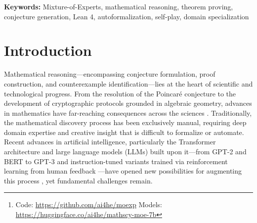 \documentclass[11pt,a4paper]{article}
\begin{document}
\begin{abstract}
evaluation focuses on conjecture generation quality; problem-solving benchmarks (MATH, GSM8K) are planned as future work requiring GPU inference. The trained models, code, and LLM-verified conjectures are publicly available.\footnote{Code: \url{https://github.com/ai4he/moexp} \quad Models: \url{https://huggingface.co/ai4he/mathscy-moe-7b}}
\end{abstract}

\textbf{Keywords:} Mixture-of-Experts, mathematical reasoning, theorem proving, conjecture generation, Lean 4, autoformalization, self-play, domain specialization

\section{Introduction}
\label{sec:introduction}

Mathematical reasoning---encompassing conjecture formulation, proof construction, and counterexample identification---lies at the heart of scientific and technological progress. From the resolution of the Poincar\'{e} conjecture to the development of cryptographic protocols grounded in algebraic geometry, advances in mathematics have far-reaching consequences across the sciences \citep{hartshorne1977algebraic, sturmfels2002solving}. Traditionally, the mathematical discovery process has been exclusively manual, requiring deep domain expertise and creative insight that is difficult to formalize or automate. Recent advances in artificial intelligence, particularly the Transformer architecture \citep{vaswani2017attention} and large language models (LLMs) built upon it---from GPT-2 \citep{radford2019language} and BERT \citep{devlin2019bert} to GPT-3 \citep{brown2020language} and instruction-tuned variants trained via reinforcement learning from human feedback \citep{ouyang2022training}---have opened new possibilities for augmenting this process \citep{davies2021advancing, romera2024mathematical, he2023machine}, yet fundamental challenges remain.
\end{document}
